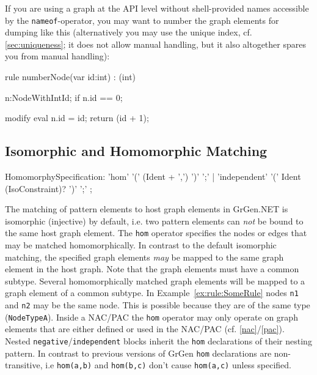 \begin{note}
If you are using a graph at the API level without shell-provided names accessible by the \texttt{nameof}-operator, you may want to number the graph elements for dumping like this (alternatively you may use the unique index, cf. \ref{sec:uniqueness}; it does not allow manual handling, but it also altogether spares you from manual handling):
\begin{grgen}
rule numberNode(var id:int) : (int)
{
  n:NodeWithIntId;
  if { n.id == 0; }

  modify {
    eval {
      n.id = id;
    }
    return (id + 1);
  }
}
\end{grgen}
\end{note}


\subsection{Isomorphic and Homomorphic Matching}\label{rule:homspec}

\begin{rail}
  HomomorphySpecification:
    'hom' '(' (Ident + ',') ')' ';' |
    'independent' '(' Ident (IsoConstraint)? ')' ';'
    ;
\end{rail}

The matching of pattern elements to host graph elements in GrGen.NET is isomorphic (injective) by default, 
i.e. two pattern elements can \emph{not} be bound to the same host graph element.
The \texttt{hom} operator specifies the nodes or edges that may be matched homomorphically.
In contrast to the default isomorphic matching, the specified graph elements \emph{may} be mapped to the same graph element in the host graph. Note that the graph elements must have a common subtype.
Several homomorphically matched graph elements will be mapped to a graph element of a common subtype.
In Example~\ref{ex:rule:SomeRule} nodes \texttt{n1} and \texttt{n2} may be the same node. This is possible because they are of the same type (\texttt{NodeTypeA}).
Inside a NAC/PAC the \texttt{hom} operator may only operate on graph elements that are either defined or used in the NAC/PAC (cf. \ref{nac}/\ref{pac}).
Nested \texttt{negative}/\texttt{independent} blocks inherit the \texttt{hom} declarations of their nesting pattern.
In contrast to previous versions of GrGen \texttt{hom} declarations are non-transitive, i.e \texttt{hom(a,b)} and \texttt{hom(b,c)} don't cause \texttt{hom(a,c)} unless specified.

